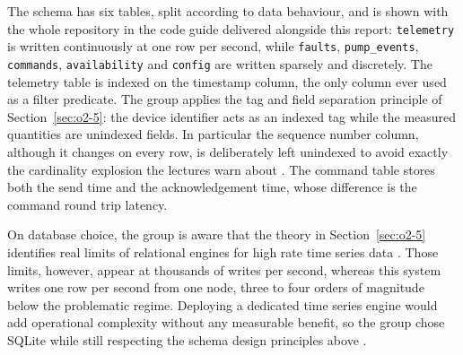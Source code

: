 The schema has six tables, split according to data behaviour, and is shown with the whole repository in the code guide delivered alongside this report: \texttt{telemetry} is written continuously at one row per second, while \texttt{faults}, \texttt{pump\_events}, \texttt{commands}, \texttt{availability} and \texttt{config} are written sparsely and discretely. The telemetry table is indexed on the timestamp column, the only column ever used as a filter predicate. The group applies the tag and field separation principle of Section~\ref{sec:o2-5}: the device identifier acts as an indexed tag while the measured quantities are unindexed fields. In particular the sequence number column, although it changes on every row, is deliberately left unindexed to avoid exactly the cardinality explosion the lectures warn about \cite{slide04}. The command table stores both the send time and the acknowledgement time, whose difference is the command round trip latency.

On database choice, the group is aware that the theory in Section~\ref{sec:o2-5} identifies real limits of relational engines for high rate time series data \cite{slide04}. Those limits, however, appear at thousands of writes per second, whereas this system writes one row per second from one node, three to four orders of magnitude below the problematic regime. Deploying a dedicated time series engine would add operational complexity without any measurable benefit, so the group chose SQLite while still respecting the schema design principles above \cite{sqlite}.


